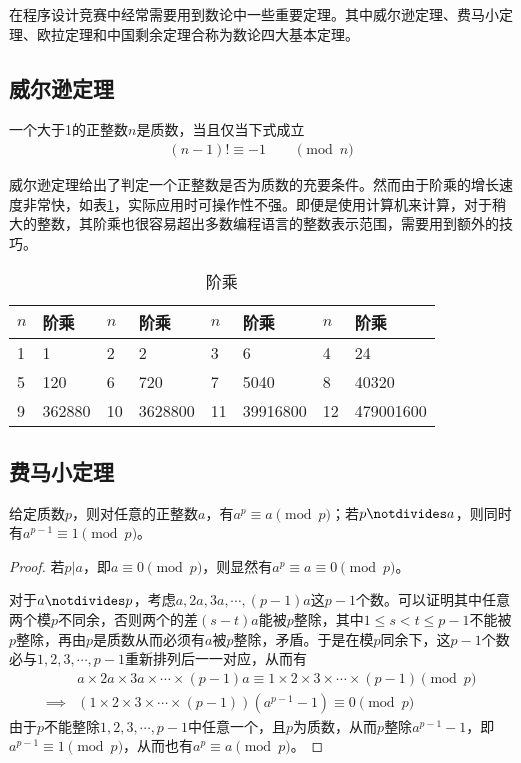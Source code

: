 在程序设计竞赛中经常需要用到数论中一些重要定理。其中威尔逊定理、费马小定理、欧拉定理和中国剩余定理合称为数论四大基本定理。

\subsection{威尔逊定理}
\label{sec:wilson-theorem}
\begin{theorem}
  一个大于1的正整数$n$是质数，当且仅当下式成立
  \begin{align*}
    \left(n-1\right)!\equiv-1 \quad\quad \pmod{n}
  \end{align*}
\end{theorem}

威尔逊定理给出了判定一个正整数是否为质数的充要条件。然而由于阶乘的增长速度非常快，如表\ref{tab:factorial}，实际应用时可操作性不强。即便是使用计算机来计算，对于稍大的整数，其阶乘也很容易超出多数编程语言的整数表示范围，需要用到额外的技巧。
\begin{table}[htbp]
  \centering
  \caption{阶乘}
  \label{tab:factorial}
  \begin{tabular}{ll||ll||ll||ll}
    \hline
    $n$ & 阶乘    & $n$ & 阶乘    & $n$ & 阶乘     & $n$ & 阶乘 \\\hline
    1   & 1      & 2   & 2       & 3   & 6        & 4   & 24\\
    5   & 120    & 6   & 720     & 7   & 5040     & 8   & 40320\\
    9   & 362880 & 10  & 3628800 & 11  & 39916800 & 12  & 479001600\\
    \hline
  \end{tabular}
\end{table}


\subsection{费马小定理}
\label{sec:Fermat-little-theorem}

\begin{theorem}
  给定质数$p$，则对任意的正整数$a$，有$a^p\equiv a\pmod p$；若$p\notdivides a$，则同时有$a^{p-1}\equiv1\pmod p$。
\end{theorem}
\begin{proof}
  若$p|a$，即$a\equiv0\pmod p$，则显然有$a^p\equiv a\equiv0\pmod p$。

  对于$a\notdivides p$，考虑$a,2a,3a,\cdots,(p-1)a$这$p-1$个数。可以证明其中任意两个模$p$不同余，否则两个的差$(s-t)a$能被$p$整除，其中$1\le s<t\le p-1$不能被$p$整除，再由$p$是质数从而必须有$a$被$p$整除，矛盾。于是在模$p$同余下，这$p-1$个数必与$1,2,3,\cdots,p-1$重新排列后一一对应，从而有
  \begin{align*}
    & a \times 2a \times 3a \times \cdots \times (p-1)a
    \equiv 1 \times 2 \times 3 \times \cdots \times (p-1) \pmod p\\
    \implies & (1\times 2\times 3\times\cdots\times (p-1))(a^{p-1}-1)\equiv0\pmod p
  \end{align*}
  由于$p$不能整除$1,2,3,\cdots,p-1$中任意一个，且$p$为质数，从而$p$整除$a^{p-1}-1$，即$a^{p-1}\equiv1\pmod p$，从而也有$a^p\equiv a\pmod p$。
\end{proof}

